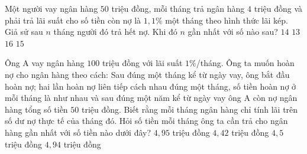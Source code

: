 \begin{ex}%
    [Chuyên Thái Nguyên 2019]%
    Một người vay ngân hàng $50$ triệu đồng, mỗi tháng trả ngân hàng $4$ triệu đồng và phải trả lãi suất cho số tiền còn nợ là $1,1\%$ một tháng theo hình thức lãi kép. Giả sử sau $n$ tháng người đó trả hết nợ. Khi đó $n$ gần nhất với số nào sau?
    \choice
    {\True $ 14$}
    {$ 13$}
    {$ 16$}
    {$ 15$}
\end{ex}
\begin{ex}%
    Ông A vay ngân hàng $ 100$ triệu đồng với lãi suất $ 1\%$/tháng. Ông ta muốn hoàn nợ cho ngân hàng theo cách: Sau đúng một tháng kể từ ngày vay, ông bắt đầu hoàn nợ; hai lần hoàn nợ liên tiếp cách nhau đúng một tháng, số tiền hoàn nợ ở mỗi tháng là như nhau và sau đúng một năm kể từ ngày vay ông A còn nợ ngân hàng tổng số tiền $ 50$ triệu đồng. Biết rằng mỗi tháng ngân hàng chỉ tính lãi trên số dư nợ thực tế của tháng đó. Hỏi số tiền mỗi tháng ông ta cần trả cho ngân hàng gần nhất với số tiền nào dưới đây?
    \choice
    {$ 4,95$ triệu đồng}
    {$ 4,42$ triệu đồng}
    {$ 4,5$ triệu đồng}
    {\True $ 4,94$ triệu đồng}
\end{ex}
